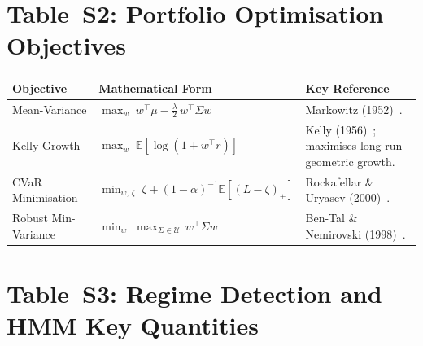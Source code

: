 \documentclass[12pt,openany]{book}
\numberwithin{equation}{chapter}
\theoremstyle{plain}
\theoremstyle{definition}
\theoremstyle{remark}
\numberwithin{equation}{chapter}
\theoremstyle{plain}
\begin{document}
\section*{Table~S2: Portfolio Optimisation Objectives}

\begin{center}
\begin{tabularx}{\textwidth}{@{} l X X @{}}
\hline
\textbf{Objective} & \textbf{Mathematical Form} & \textbf{Key Reference} \\
\hline
Mean-Variance &
  $\max_{w}\;w^\top\mu - \tfrac{\lambda}{2}\,w^\top\Sigma w$ &
  Markowitz (1952)~\cite{R1}. \\
\addlinespace
Kelly Growth &
  $\max_{w}\;\mathbb{E}[\log(1 + w^\top r)]$ &
  Kelly (1956)~\cite{R2}; maximises long-run geometric growth. \\
\addlinespace
CVaR Minimisation &
  $\min_{w,\,\zeta}\;\zeta + (1-\alpha)^{-1}\mathbb{E}[(L-\zeta)_+]$ &
  Rockafellar \& Uryasev (2000)~\cite{R5}. \\
\addlinespace
Robust Min-Variance &
  $\min_{w}\;\max_{\Sigma\in\mathcal{U}}\,w^\top\Sigma w$ &
  Ben-Tal \& Nemirovski (1998)~\cite{R8}. \\
\hline
\end{tabularx}
\end{center}

\section*{Table~S3: Regime Detection and HMM Key Quantities}
\end{document}
